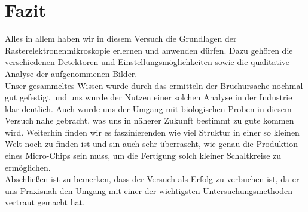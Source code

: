 
\chapter{Fazit}
\label{chap:fazit}
Alles in allem haben wir in diesem Versuch die Grundlagen der Rasterelektronenmikroskopie erlernen und anwenden dürfen. Dazu gehören die verschiedenen Detektoren und Einstellungsmöglichkeiten sowie die qualitative Analyse der aufgenommenen Bilder.\\
Unser gesammeltes Wissen wurde durch das ermitteln der Bruchursache nochmal gut gefestigt und uns wurde der Nutzen einer solchen Analyse in der Industrie klar deutlich. Auch wurde uns der Umgang mit biologischen Proben in diesem Versuch nahe gebracht, was uns in näherer Zukunft bestimmt zu gute kommen wird. Weiterhin finden wir es faszinierenden wie viel Struktur in einer so kleinen Welt noch zu finden ist und sin auch sehr überrascht, wie genau die Produktion eines Micro-Chips sein muss, um die Fertigung solch kleiner Schaltkreise zu ermöglichen.\\

Abschließen ist zu bemerken, dass der Versuch als Erfolg zu verbuchen ist, da er uns Praxisnah den Umgang mit einer der wichtigsten Untersuchungsmethoden vertraut gemacht hat.